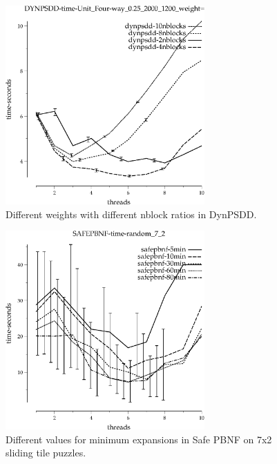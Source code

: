\documentclass{article}
\begin{document}
\begin{figure}[h!]
\includegraphics[width=3in]{../graphs/grid_unit_four-way_0.25_2000_1200/DYNPSDD-time-Unit_Four-way_0.25_2000_1200_weight=2.2.eps}
\caption{Different weights with different nblock ratios in DynPSDD.}
\label{fig:weight-grid}
\end{figure}

\begin{figure}[h!]
\includegraphics[width=3in]{../graphs/tiles_random_7_2/SAFEPBNF-time-random_7_2.eps}
\caption{Different values for minimum expansions in Safe PBNF on 7x2 sliding tile puzzles.}
\end{figure}



\end{document}
